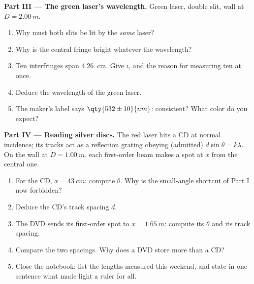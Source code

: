 \begin{problem}
\medskip
\noindent\textbf{Part III --- The green laser's wavelength.} Green
laser, double slit, wall at $D = \qty{2.00}{m}$.
\begin{enumerate}[resume]
  \item Why must both slits be lit by the \emph{same} laser?
  \item Why is the central fringe bright whatever the wavelength?
  \item Ten interfringes span \qty{4.26}{cm}. Give $i$, and the reason
        for measuring ten at once.
  \item Deduce the wavelength of the green laser.
  \item The maker's label says $\qty{532 \pm 10}{nm}$: consistent?
        What color do you expect?
\end{enumerate}

\medskip
\noindent\textbf{Part IV --- Reading silver discs.} The red laser
hits a CD at normal incidence; its tracks act as a reflection grating
obeying (admitted) $d \sin\theta = k\lambda$. On the wall at $D =
\qty{1.00}{m}$, each first-order beam makes a spot at $x$ from the
central one.
\begin{enumerate}[resume]
  \item For the CD, $x = \qty{43}{cm}$: compute $\theta$. Why is the
        small-angle shortcut of Part I now forbidden?
  \item Deduce the CD's track spacing $d$.
  \item The DVD sends its first-order spot to $x = \qty{1.65}{m}$:
        compute its $\theta$ and its track spacing.
  \item Compare the two spacings. Why does a DVD store more than a CD?
  \item Close the notebook: list the lengths measured this weekend,
        and state in one sentence what made light a ruler for all.
\end{enumerate}
\end{problem}
